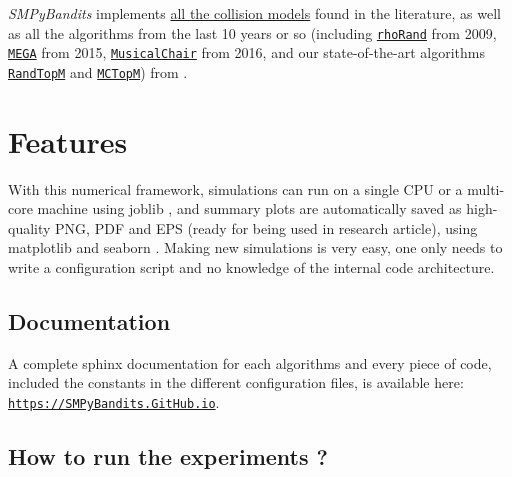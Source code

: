 \documentclass[a4paper,10pt,]{article}
\begin{document}
\emph{SMPyBandits} implements
\href{https://smpybandits.github.io/docs/Environment.CollisionModels.html}{all
the collision models} found in the literature, as well as all the
algorithms from the last 10 years or so (including
\href{https://smpybandits.github.io/docs/PoliciesMultiPlayers.rhoRand.html}{\texttt{rhoRand}}
from 2009,
\href{https://smpybandits.github.io/docs/Policies.MEGA.html}{\texttt{MEGA}}
from 2015,
\href{https://smpybandits.github.io/docs/Policies.MusicalChair.html}{\texttt{MusicalChair}}
from 2016, and our state-of-the-art algorithms
\href{https://smpybandits.github.io/docs/PoliciesMultiPlayers.RandTopM.html}{\texttt{RandTopM}}
and
\href{https://smpybandits.github.io/docs/PoliciesMultiPlayers.MCTopM.html}{\texttt{MCTopM}})
from \citet{BessonALT2018}.


\section{Features}\label{features}

With this numerical framework, simulations can run on a single CPU or a
multi-core machine using joblib \citep{joblib}, and summary plots are
automatically saved as high-quality PNG, PDF and EPS (ready for being
used in research article), using matplotlib \citep{matplotlib} and
seaborn \citep{seaborn}. Making new simulations is very easy, one only
needs to write a configuration script and no knowledge of the internal
code architecture.

\subsection{Documentation}\label{documentation}

A complete sphinx \citep{sphinx} documentation for each algorithms and
every piece of code, included the constants in the different
configuration files, is available here:
\href{https://smpybandits.github.io/}{\texttt{https://SMPyBandits.GitHub.io}}.

\subsection{How to run the experiments
?}\label{how-to-run-the-experiments}
\end{document}

